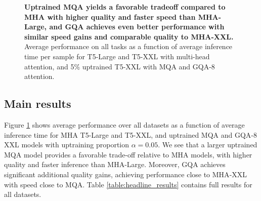 \documentclass[11pt]{article}
\newcommand{\mh}{\textsc{MHA}\xspace}
\newcommand{\mq}{\textsc{MQA}\xspace}
\newcommand{\gmq}{\textsc{GQA}\xspace}
\newcommand{\upprop}{\alpha}
\begin{document}
\begin{figure}[h]
\centering
\hspace{-0.5cm}
    \caption{{\bf Uptrained \mq yields a favorable tradeoff compared to \mh with higher quality and faster speed than \mh-Large, and \gmq achieves even better performance with similar speed gains and comparable quality to \mh-XXL.} Average performance on all tasks as a function of average inference time per sample for T5-Large and T5-XXL with multi-head attention, and 5\% uptrained T5-XXL with \mq and \gmq-8 attention.}
    \label{fig:perf_vs_time}
\end{figure}

\subsection{Main results}

Figure \ref{fig:perf_vs_time} shows average performance over all datasets as a function of average inference time for \mh T5-Large and T5-XXL, and uptrained \mq and \gmq-$8$ XXL models with uptraining proportion $\upprop = 0.05$. We see that a larger uptrained \mq model provides a favorable trade-off relative to \mh models, with higher quality and faster inference than \mh-Large. Moreover, \gmq achieves significant additional quality gains, achieving performance close to \mh-XXL with speed close to \mq. Table \ref{table:headline_results} contains full results for all datasets.
\end{document}

